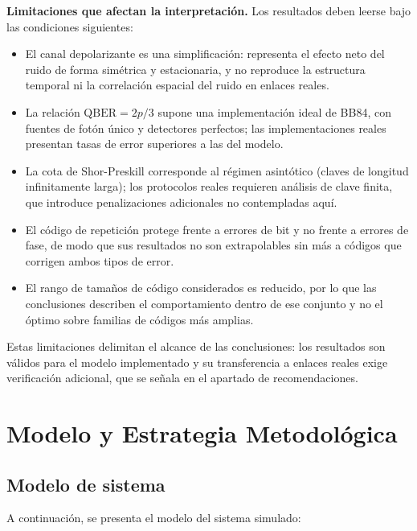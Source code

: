 \documentclass[12pt]{report}
\begin{document}
\textbf{Limitaciones que afectan la interpretación.} Los resultados deben leerse
bajo las condiciones siguientes:

\begin{itemize}
    \item El canal depolarizante es una simplificación: representa el efecto neto
    del ruido de forma simétrica y estacionaria, y no reproduce la estructura
    temporal ni la correlación espacial del ruido en enlaces reales.
    \item La relación $\mathrm{QBER} = 2p/3$ supone una implementación ideal de
    BB84, con fuentes de fotón único y detectores perfectos; las implementaciones
    reales presentan tasas de error superiores a las del modelo.
    \item La cota de Shor-Preskill corresponde al régimen asintótico (claves de
    longitud infinitamente larga); los protocolos reales requieren análisis de
    clave finita, que introduce penalizaciones adicionales no contempladas aquí.
    \item El código de repetición protege frente a errores de bit y no frente a
    errores de fase, de modo que sus resultados no son extrapolables sin más a
    códigos que corrigen ambos tipos de error.
    \item El rango de tamaños de código considerados es reducido, por lo que las
    conclusiones describen el comportamiento dentro de ese conjunto y no el
    óptimo sobre familias de códigos más amplias.
\end{itemize}

Estas limitaciones delimitan el alcance de las conclusiones: los resultados son
válidos para el modelo implementado y su transferencia a enlaces reales exige
verificación adicional, que se señala en el apartado de recomendaciones.

\chapter{Modelo y Estrategia Metodológica}

\section{Modelo de sistema}
A continuación, se presenta el modelo del sistema simulado:
\end{document}
